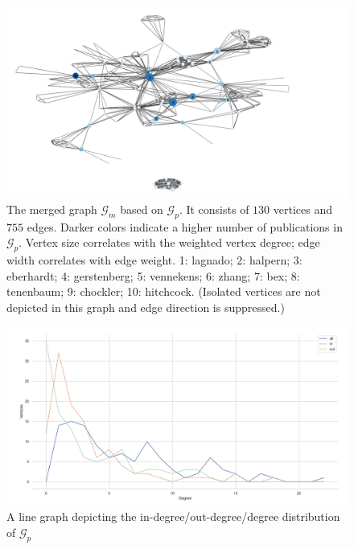 \documentclass[11pt,a4paper]{book}
\theoremstyle{definition}
\theoremstyle{definition}
\theoremstyle{definition}
\theoremstyle{remark}
\newcommand{\pgraph}{\mathcal{G}_{p}}
\newcommand{\acgraph}{\mathcal{G}_{m}}
\begin{document}
\begin{figure}
\includegraphics[width=\textwidth]{mauthor_graph.png}
\caption{The merged graph  $\acgraph$ based on $\pgraph$. It consists of  $130$ vertices and $755$ edges. 
Darker colors indicate a higher number of publications in $\pgraph$. Vertex size correlates with the weighted vertex degree; 
edge width correlates with edge weight. 1: lagnado;
2: halpern;
3: eberhardt;
4: gerstenberg;
5: vennekens;
6: zhang;
7: bex;
8: tenenbaum;
9: chockler;
10: hitchcock.
(Isolated vertices are not depicted in this graph and edge direction is suppressed.)}
\label{fig:acgraph-actual_graph}
\end{figure}




\begin{figure}[h]
\includegraphics[width=\textwidth]{degree_distribution.png}
\caption{A line graph depicting the in-degree/out-degree/degree distribution of $\pgraph$}
\label{fig:pgraph-degree_distr}
\end{figure}
\end{document}
